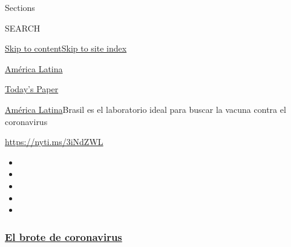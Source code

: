 Sections

SEARCH

\protect\hyperlink{site-content}{Skip to
content}\protect\hyperlink{site-index}{Skip to site index}

\href{https://www.nytimes3xbfgragh.onion/es/section/america-latina}{América
Latina}

\href{https://myaccount.nytimes3xbfgragh.onion/auth/login?response_type=cookie\&client_id=vi}{}

\href{https://www.nytimes3xbfgragh.onion/section/todayspaper}{Today's
Paper}

\href{/es/section/america-latina}{América Latina}\textbar{}Brasil es el
laboratorio ideal para buscar la vacuna contra el coronavirus

\url{https://nyti.ms/3iNdZWL}

\begin{itemize}
\item
\item
\item
\item
\item
\end{itemize}

\hypertarget{el-brote-de-coronavirus}{%
\subsubsection{\texorpdfstring{\href{https://www.nytimes3xbfgragh.onion/es/spotlight/coronavirus?name=styln-coronavirus-es\&region=TOP_BANNER\&block=storyline_menu_recirc\&action=click\&pgtype=Article\&impression_id=e3193ab0-f4b9-11ea-b32a-256dc0696bd9\&variant=undefined}{El
brote de
coronavirus}}{El brote de coronavirus}}\label{el-brote-de-coronavirus}}

